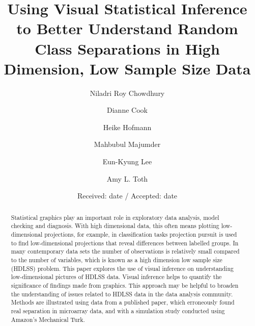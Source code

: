 \topmargin -0.10in   %
\textheight 8.5in  %






\title{Using Visual Statistical Inference to Better Understand Random Class Separations in High Dimension, Low Sample Size Data}\label{ch:largepsmalln}
\vspace{-0.8cm}
\author{Niladri Roy Chowdhury \and 
Dianne Cook \and
Heike Hofmann \and
Mahbubul Majumder \and
Eun-Kyung Lee \and
Amy L. Toth}


\date{Received: date / Accepted: date}

\maketitle

\begin{abstract}
Statistical graphics play an important role in exploratory data analysis, model checking and diagnosis. With high dimensional data, this often means plotting low-dimensional projections, for example, in classification tasks projection pursuit is used to find low-dimensional projections that reveal differences between labelled groups. In many contemporary data sets the number of observations is relatively small compared to the number of variables, which is known as a high dimension low sample size (HDLSS) problem. This paper explores the use of visual inference on understanding low-dimensional pictures of HDLSS data. Visual inference helps to quantify the significance of findings made from graphics.  This approach may be helpful to broaden the understanding of issues related to HDLSS data in the data analysis community. Methods are illustrated using data from a published paper, which erroneously found real separation in microarray data, and with a simulation study conducted using Amazon's Mechanical Turk.

\end{abstract}


